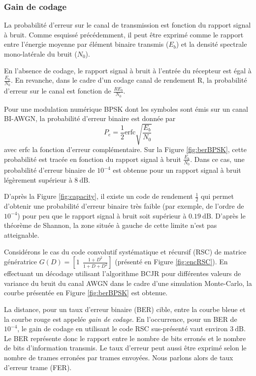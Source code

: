 \subsubsection{Gain de codage}
La probabilité d'erreur sur le canal de transmission est fonction du rapport signal à bruit. Comme esquissé précédemment, 
il peut être exprimé comme le rapport entre l'énergie moyenne par élément binaire transmis ($E_b$) et la densité 
spectrale mono-latérale du bruit ($N_0$).

En l'absence de codage, le rapport signal à bruit à l'entrée du récepteur est égal à $\frac{E_b}{N_0}$. En revanche, 
dans le cadre d'un codage canal de rendement R, la probabilité d'erreur sur le canal est fonction de $\frac{RE_b}{N_0}$.

Pour une modulation numérique BPSK dont les symboles sont émis sur un canal BI-AWGN, la probabilité d'erreur binaire est
donnée par 
\begin{equation}
	P_e = \frac{1}{2} \text{erfc}\sqrt{\frac{E_b}{N_0}}
\end{equation}
avec erfc la fonction d'erreur complémentaire.
Sur la Figure \ref{fig:berBPSK}, cette probabilité est tracée en fonction du rapport signal à bruit $\frac{E_b}{N_0}$.
Dans ce cas, une probabilité d'erreur binaire de $10^{-4}$ est obtenue pour un rapport signal à bruit légèrement 
supérieur à $8~\text{dB}$. 

D'après la Figure \ref{fig:capacity}, il existe un code de rendement $\frac{1}{2}$ qui permet d'obtenir une probabilité 
d'erreur binaire très faible (par exemple, de l'ordre de $10^{-4}$) pour peu que le rapport signal à bruit soit supérieur 
à $0.19~\text{dB}$. D'après le théorème de Shannon, la zone située à gauche de cette limite n'est pas atteignable.

Considérons le cas du code convolutif systématique et récursif (RSC) de matrice génératrice 
$G(D) = \left[ 1 ~~\frac{1+D^2}{1+D+D^2} \right]$ (présenté en Figure \ref{fig:encRSC}). 
En effectuant un décodage utilisant l'algorithme BCJR pour différentes valeurs de variance du bruit du canal AWGN dans le cadre d'une simulation Monte-Carlo, la courbe présentée en Figure \ref{fig:berBPSK} est obtenue. 

La distance, pour un taux d'erreur binaire (BER) cible, entre la courbe bleue et la courbe rouge est appelée \emph{gain de 
	codage}. En l'occurrence, pour un BER de $10 ^{-4}$, le gain de codage en utilisant le code RSC sus-présenté vaut
environ $3~\text{dB}$. Le BER représente donc le rapport entre le nombre de bits erronés et le nombre de bits 
d'information transmis. Le taux d'erreur peut aussi être exprimé selon le nombre de trames erronées par trames envoyées. 
Nous parlons alors de taux d'erreur trame (FER).

